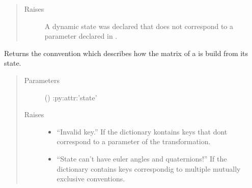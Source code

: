 \documentclass[letterpaper,10pt,english]{sphinxmanual}
\begin{document}
\begin{fulllineitems}
\begin{quote}
\begin{description}
\begin{itemize}
\end{itemize}

\item[{Raises}] \leavevmode
{} \textendash{} A dynamic state was declared that does not correspond to a parameter declared in .

\end{description}\end{quote}

\begin{fulllineitems}
\label{\detokenize{code_docu:trip_kinematics.KinematicGroup.Transformation.get_convention}}
Returns the connvention which describes how the matrix  of a {\hyperref[\detokenize{code_docu:trip_kinematics.KinematicGroup.Transformation}]{}} is build from its state.
\begin{quote}\begin{description}
\item[{Parameters}] \leavevmode
{} (\sphinxstyleliteralemphasis{\sphinxupquote{{[}}}\sphinxstyleliteralemphasis{\sphinxupquote{, }}\sphinxstyleliteralemphasis{\sphinxupquote{{]}}}) \textendash{} :py:attr:’state’

\item[{Raises}] \leavevmode\begin{itemize}
\item {} 
 \textendash{} “Invalid key.” If the dictionary kontains keys that dont correspond to a parameter of the transformation.

\item {} 
 \textendash{} “State can’t have euler angles and quaternions!” If the dictionary contains keys correspondig to multiple mutually exclusive conventions.


\end{itemize}
\end{description}
\end{quote}
\end{fulllineitems}
\end{fulllineitems}
\end{document}
